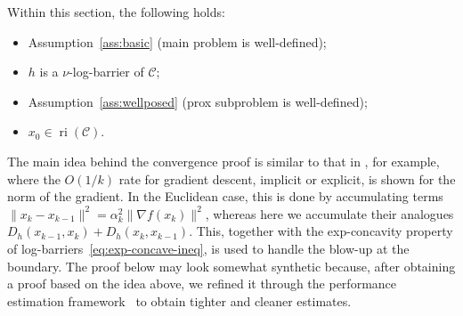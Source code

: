 \documentclass[a4paper]{article}
\newcommand{\CC}{\mathcal{C}}
\newcommand{\n}[1]{\|#1 \|}
\DeclareMathOperator{\ri}{ri}
\begin{document}
Within this section, the following holds:
\begin{itemize}
        \item Assumption~\ref{ass:basic} (main problem is well-defined);
        \item $h$ is a $\nu$-log-barrier of $\CC$;
        \item Assumption~\ref{ass:wellposed} (prox subproblem is well-defined);
        \item $x_0\in \ri(\CC)$.
\end{itemize}

The main idea behind the convergence proof is similar to that in \cite{teboulle2023elementary}, for example, where the $O(1/k)$ rate for gradient descent, implicit or explicit, is shown for the norm of the gradient.
In the Euclidean case, this is done by accumulating terms $\n{x_k-x_{k-1}}^2 = \alpha_k^2\n{\nabla f(x_k)}^2$, whereas here we accumulate their analogues $D_h(x_{k-1},x_{k}) +D_h(x_{k},x_{k-1})$.
This, together with the exp-concavity property of log-barriers~\eqref{eq:exp-concave-ineq}, is used to handle the blow-up at the boundary.
The proof below may look somewhat synthetic because, after obtaining a proof based on the idea above, we refined it through the performance estimation framework~\cite{taylor2017smooth,dragomir2022optimal} to obtain tighter and cleaner estimates.
\end{document}
